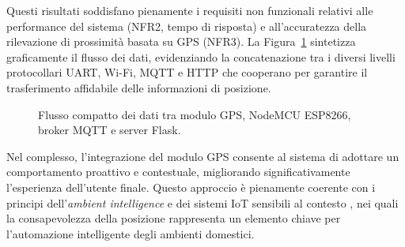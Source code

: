 Questi risultati soddisfano pienamente i requisiti non funzionali relativi alle performance del sistema (NFR2, tempo di risposta) e all’accuratezza della rilevazione di prossimità basata su GPS (NFR3). La Figura~\ref{fig:gps_flow} sintetizza graficamente il flusso dei dati, evidenziando la concatenazione tra i diversi livelli protocollari UART, Wi-Fi, MQTT e HTTP che cooperano per garantire il trasferimento affidabile delle informazioni di posizione.

\begin{figure}[h!]
\centering
{}
\caption{Flusso compatto dei dati tra modulo GPS, NodeMCU ESP8266, broker MQTT e server Flask.}
\label{fig:gps_flow}
\end{figure}

Nel complesso, l'integrazione del modulo GPS consente al sistema di adottare un comportamento proattivo e contestuale, migliorando significativamente l'esperienza dell'utente finale.
Questo approccio è pienamente coerente con i principi dell'\textit{ambient intelligence} e dei sistemi IoT sensibili al contesto \cite{Perera2015}, nei quali la consapevolezza della posizione rappresenta un elemento chiave per l'automazione intelligente degli ambienti domestici.

